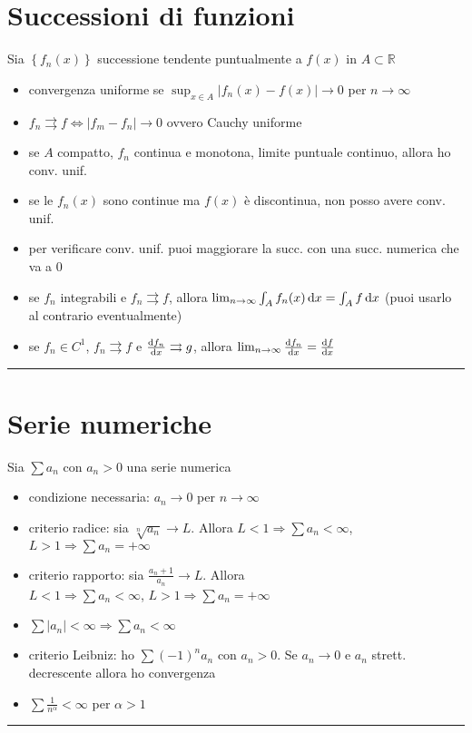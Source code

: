 \documentclass[a4paper,portrait,columns=3,5pt]{cheatsheet}
\begin{document}
\section{Successioni di funzioni}
Sia $\left\{ f_n(x)\right\}$ successione tendente puntualmente a $f(x)$ in $A\subset \mathbb{R}$
\begin{itemize}
    \item convergenza uniforme se $\sup_{x\in A}\left|f_n(x) - f(x)\right| \rightarrow 0$ per $n\rightarrow \infty$
    \item $f_n\rightrightarrows f \Leftrightarrow \left| f_m - f_n \right| \rightarrow 0$ ovvero Cauchy uniforme
    \item se $A$ compatto, $f_n$ continua e monotona, limite puntuale continuo, allora ho conv. unif.
    \item se le $f_n(x)$ sono continue ma $f(x)$ è discontinua, non posso avere conv. unif. 
    \item per verificare conv. unif. puoi maggiorare la succ. con una succ. numerica che va a 0
    \item se $f_n$ integrabili e $f_n\rightrightarrows f$, allora $\lim_{n\rightarrow \infty} \int_A f_n(x) \dif x = \int_A f \dif x$ (puoi usarlo al contrario eventualmente)
    \item se $f_n \in C^1$, $f_n\rightrightarrows f$ e $\frac{\dif f_n}{\dif x} \rightrightarrows g$, allora $\lim_{n\rightarrow \infty} \frac{\dif f_n}{\dif x} = \frac{\dif f}{\dif x}$ 
\end{itemize}
\hrule

\section{Serie numeriche}
Sia $\sum a_n$ con $a_n > 0$ una serie numerica
\begin{itemize}
    \item condizione necessaria: $a_n \rightarrow 0$ per $n \rightarrow \infty$
    \item criterio radice: sia $ \sqrt[n]{a_n} \rightarrow L$. Allora $L<1 \Rightarrow \sum a_n< \infty$, $L>1 \Rightarrow \sum a_n = + \infty$
    \item criterio rapporto: sia $\frac{a_n+1}{a_n} \rightarrow L$. Allora \\$L<1 \Rightarrow \sum a_n< \infty$, $L>1 \Rightarrow \sum a_n = + \infty$
    \item $\sum \left| a_n \right| < \infty \Rightarrow \sum a_n< \infty$
    \item criterio Leibniz: ho $\sum (-1)^n a_n$ con $a_n > 0$. Se $a_n \rightarrow 0$ e $a_n$ strett. decrescente allora ho convergenza
    \item $\sum \frac{1}{n^\alpha} < \infty$ per $\alpha > 1$
    
\end{itemize}
\hrule
\end{document}
